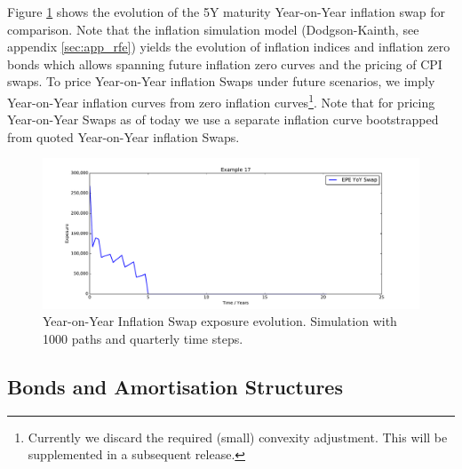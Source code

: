 \documentclass[12pt, a4paper]{article}
\begin{document}
Figure \ref{fig_yoy_swap} shows the evolution of the 5Y maturity Year-on-Year inflation swap for comparison. Note that the inflation simulation model (Dodgson-Kainth, see appendix \ref{sec:app_rfe}) yields the evolution of inflation indices and inflation zero bonds which allows spanning future inflation zero curves and the pricing of CPI swaps. To price Year-on-Year inflation Swaps under future scenarios, we imply Year-on-Year inflation curves from zero inflation curves\footnote{Currently we discard the required (small) convexity adjustment. This will be supplemented in a subsequent release.}. Note that for pricing Year-on-Year Swaps as of today we use a separate inflation curve bootstrapped from quoted Year-on-Year inflation Swaps.
 
\begin{figure}[h!]
	\begin{center}
		\includegraphics[scale=0.45]{mpl_yoy_swap.pdf}
	\end{center}
	\caption{Year-on-Year Inflation Swap exposure evolution. Simulation with 1000 paths and quarterly time steps.}
	\label{fig_yoy_swap}
\end{figure}

\subsection{Bonds and Amortisation Structures}%
\end{document}
